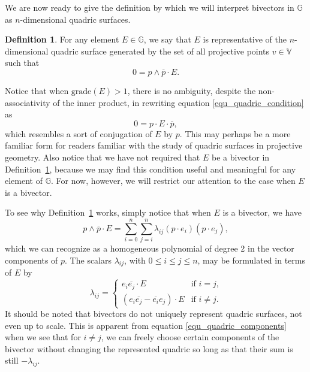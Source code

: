 \documentclass{ecgd-l}
\newcommand{\G}{\mathbb{G}}
\newcommand{\V}{\mathbb{V}}
\theoremstyle{definition}
\newtheorem{definition}[theorem]{Definition}
\theoremstyle{remark}
\numberwithin{equation}{section}
\begin{document}
We are now ready to give the definition by which we will interpret bivectors in $\G$
as $n$-dimensional quadric surfaces.
\begin{definition}\label{def_quadric}
For any element $E\in\G$, we say that $E$ is representative of the $n$-dimensional
quadric surface generated by the set of all projective points $v\in\V$ such that
\begin{equation}\label{equ_quadric_condition}
0 = p\wedge\overline{p}\cdot E.
\end{equation}
\end{definition}
Notice that when $\mbox{grade}(E)>1$, there is no ambiguity, despite the non-associativity
of the inner product, in rewriting equation
\eqref{equ_quadric_condition} as
\begin{equation}
0 = p\cdot E\cdot\overline{p},
\end{equation}
which resembles a sort of conjugation of $E$ by $p$.  This may perhaps be a more
familiar form for readers familiar with the study of quadric surfaces in projective geometry.
Also notice that we have not required that $E$ be a bivector in Definition~\ref{def_quadric},
because we may find this condition useful and meaningful for any element of $\G$.  For now,
however, we will restrict our attention to the case when $E$ is a bivector.

To see why Definition~\ref{def_quadric} works, simply notice that when $E$ is a bivector, we have
\begin{equation}\label{equ_homogeneous_polynomial}
p\wedge\overline{p}\cdot E=\sum_{i=0}^n\sum_{j=i}^n \lambda_{ij}(p\cdot e_i)(p\cdot e_j),
\end{equation}
which we can recognize as a homogeneous polynomial of degree 2 in the vector components of $p$.
The scalars $\lambda_{ij}$, with $0\leq i\leq j\leq n$, may be formulated in terms of $E$ by
\begin{equation}\label{equ_quadric_components}
\lambda_{ij} = \left\{\begin{array}{ll}
e_i\overline{e_j}\cdot E & \mbox{if $i=j$,} \\
\left(e_i\overline{e_j}-\overline{e_i}e_j\right)\cdot E & \mbox{if $i\neq j$.}
\end{array}\right.
\end{equation}
It should be noted that bivectors do not uniquely represent quadric surfaces, not even up to scale.
This is apparent from equation \eqref{equ_quadric_components} when we see that for $i\neq j$,
we can freely choose certain components of the bivector without changing the represented
quadric so long as that their sum is still $-\lambda_{ij}$.
\end{document}
